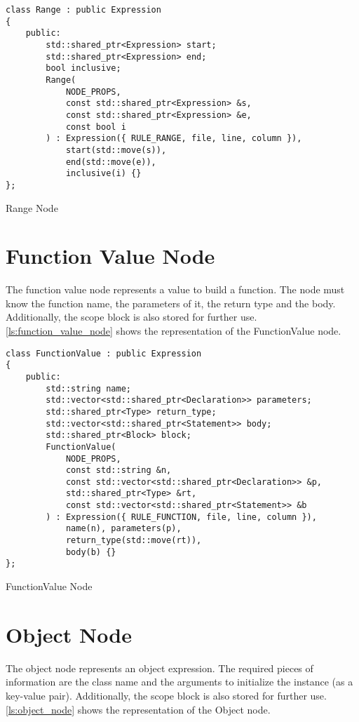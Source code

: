 \begin{listing}[H]
\begin{verbatim}
class Range : public Expression
{
    public:
        std::shared_ptr<Expression> start;
        std::shared_ptr<Expression> end;
        bool inclusive;
        Range(
            NODE_PROPS,
            const std::shared_ptr<Expression> &s,
            const std::shared_ptr<Expression> &e,
            const bool i
        ) : Expression({ RULE_RANGE, file, line, column }),
            start(std::move(s)),
            end(std::move(e)),
            inclusive(i) {}
};
\end{verbatim}
\caption{Range Node}
\label{ls:range_node}
\end{listing}

\section{Function Value Node}

The function value node represents a value to build a function. The node must know the function name,
the parameters of it, the return type and the body. Additionally, the scope block is also stored for further use.
\autoref{ls:function_value_node} shows the representation of the FunctionValue node.

\begin{listing}[H]
\begin{verbatim}
class FunctionValue : public Expression
{
    public:
        std::string name;
        std::vector<std::shared_ptr<Declaration>> parameters;
        std::shared_ptr<Type> return_type;
        std::vector<std::shared_ptr<Statement>> body;
        std::shared_ptr<Block> block;
        FunctionValue(
            NODE_PROPS,
            const std::string &n,
            const std::vector<std::shared_ptr<Declaration>> &p,
            std::shared_ptr<Type> &rt,
            const std::vector<std::shared_ptr<Statement>> &b
        ) : Expression({ RULE_FUNCTION, file, line, column }),
            name(n), parameters(p),
            return_type(std::move(rt)),
            body(b) {}
};
\end{verbatim}
\caption{FunctionValue Node}
\label{ls:function_value_node}
\end{listing}

\section{Object Node}

The object node represents an object expression. The required pieces of information are the class name and the arguments to initialize the instance (as a key-value pair).
Additionally, the scope block is also stored for further use.
\autoref{ls:object_node} shows the representation of the Object node.

